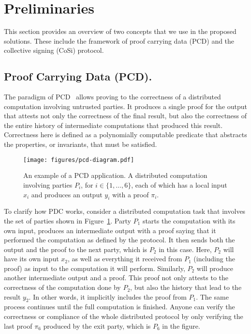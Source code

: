\section{Preliminaries}
\label{prelim}
This section provides an overview of two concepts that we use in the proposed solutions. These include the framework of proof carrying data (PCD) and the collective signing (CoSi) protocol.


\subsection{Proof Carrying Data (PCD).}
The paradigm of PCD~\cite{chiesa2010proof} allows proving to the correctness of a distributed computation involving untrusted parties. It produces a single proof for the output that attests not only the correctness of the final result, but also the correctness of the entire history of intermediate computations that produced this result. Correctness here is defined as a polynomially computable predicate that abstracts the properties, or invariants, that must be satisfied.


\begin{figure}[h!]
\centerline{
\texttt{[image: figures/pcd-diagram.pdf]}}
\caption{An example of a PCD application. A distributed computation involving parties $P_i$, for 
$i \in \{1, \dots, 6\}$, each 
of which has a local input $x_i$ and produces an output $y_i$ with a proof $\pi_i$. }
\label{pcd-diagram}
\end{figure}


To clarify how PDC works, consider a distributed computation task that involves the set of parties shown in Figure~\ref{pcd-diagram}. Party $P_1$ starts the computation with its own input, produces an intermediate output with a proof saying that it performed the computation as defined by the protocol. It then sends both the output and the proof to the next party, which is $P_2$ in this case. Here, $P_2$ will have its own input $x_2$, as well as everything it received from $P_1$ (including the proof) as input to the computation it will perform. Similarly, $P_2$ will produce another intermediate output and a proof. This proof not only attests to the correctness of the computation done by $P_2$, but also the history that lead to the result $y_2$. In other 
words, it implicitly includes the proof from $P_1$. The same process continues until the full computation is finished. Anyone can verify the correctness or compliance of the whole distributed protocol by only verifying the last proof $\pi_6$ produced by the exit party, which is $P_6$ in the figure.


